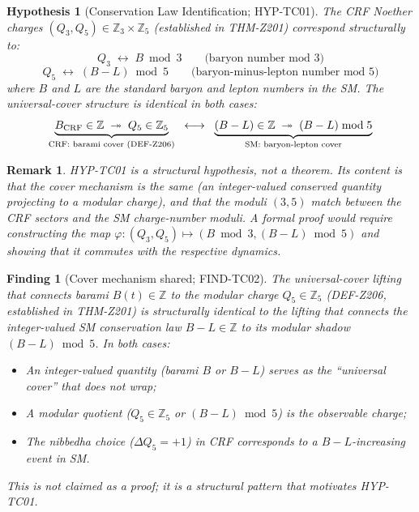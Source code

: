 \documentclass[12pt, a4paper]{article}
\newtheorem{remark}{Remark}[section]
\newtheorem{finding}{Finding}[section]
\newtheorem{hypothesis}{Hypothesis}[section]
\begin{document}
\begin{hypothesis}[Conservation Law Identification; HYP-TC01]
\label{hyp:conservation}
The CRF Noether charges $(Q_3, Q_5) \in \mathbb{Z}_3 \times \mathbb{Z}_5$
(established in THM-Z201) correspond structurally to:
\begin{equation}
  Q_3 \;\longleftrightarrow\; B \bmod 3
  \qquad\text{(baryon number mod 3)}
  \label{eq:id-Q3}
\end{equation}
\begin{equation}
  Q_5 \;\longleftrightarrow\; (B-L) \bmod 5
  \qquad\text{(baryon-minus-lepton number mod 5)}
  \label{eq:id-Q5}
\end{equation}
where $B$ and $L$ are the standard baryon and lepton numbers in
the SM. The universal-cover structure is identical in both cases:
\begin{equation}
  \underbrace{B_{\rm CRF} \in \mathbb{Z} \;\twoheadrightarrow\;
  Q_5 \in \mathbb{Z}_5}_{\text{CRF: barami cover (DEF-Z206)}}
  \;\;\longleftrightarrow\;\;
  \underbrace{(B-L) \in \mathbb{Z} \;\twoheadrightarrow\;
  (B-L)\bmod 5}_{\text{SM: baryon-lepton cover}}
  \label{eq:cover-identification}
\end{equation}
\end{hypothesis}

\begin{remark}
HYP-TC01 is a structural hypothesis, not a theorem. Its content is
that the \emph{cover mechanism} is the same (an integer-valued
conserved quantity projecting to a modular charge), and that the
moduli $(3, 5)$ match between the CRF sectors and the SM
charge-number moduli. A formal proof would require constructing the
map $\varphi: (Q_3, Q_5) \mapsto (B \bmod 3, (B-L) \bmod 5)$
and showing that it commutes with the respective dynamics.
\end{remark}

\begin{finding}[Cover mechanism shared; FIND-TC02]
\label{find:cover}
The universal-cover lifting that connects barami $B(t) \in \mathbb{Z}$
to the modular charge $Q_5 \in \mathbb{Z}_5$ (DEF-Z206, established
in THM-Z201) is structurally identical to the lifting that connects
the integer-valued SM conservation law $B-L \in \mathbb{Z}$ to its
modular shadow $(B-L) \bmod 5$. In both cases:
\begin{itemize}[leftmargin=*, noitemsep]
  \item An integer-valued quantity (barami $B$ or $B-L$) serves as
    the ``universal cover'' that does not wrap;
  \item A modular quotient ($Q_5 \in \mathbb{Z}_5$ or
    $(B-L)\bmod 5$) is the observable charge;
  \item The nibbedha choice ($\Delta Q_5 = +1$) in CRF corresponds
    to a $B-L$-increasing event in SM.
\end{itemize}
This is not claimed as a proof; it is a structural pattern that
motivates HYP-TC01.
\end{finding}
\end{document}
